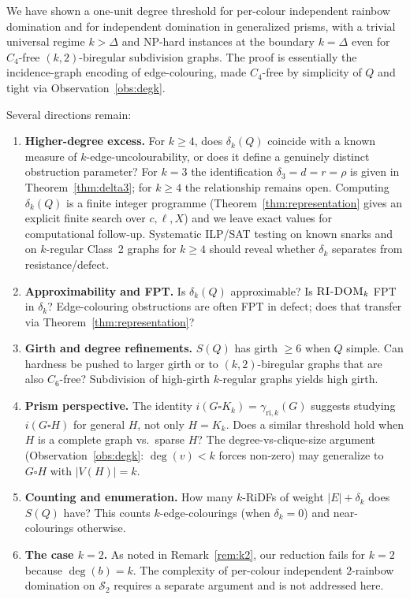 \documentclass[11pt,a4paper]{article}
\theoremstyle{plain}
\theoremstyle{definition}
\newcommand{\gri}{\gamma_{\mathrm{ri},k}}
\newcommand{\cardK}{\square K_k}
\newcommand{\cS}{\mathcal{S}}
\begin{document}
We have shown a one-unit degree threshold for per-colour independent rainbow domination and for independent domination in generalized prisms, with a trivial universal regime $k>\Delta$ and NP-hard instances at the boundary $k=\Delta$ even for $C_{4}$-free $(k,2)$-biregular subdivision graphs. The proof is essentially the incidence-graph encoding of edge-colouring, made $C_{4}$-free by simplicity of $Q$ and tight via Observation~\ref{obs:degk}.

Several directions remain:

\begin{enumerate}
\item \textbf{Higher-degree excess.}
For $k\ge4$, does $\delta_{k}(Q)$ coincide with a known measure of $k$-edge-uncolourability, or does it define a genuinely distinct obstruction parameter? For $k=3$ the identification $\delta_{3}=d=r=\rho$ is given in Theorem~\ref{thm:delta3}; for $k\ge4$ the relationship remains open. Computing $\delta_{k}(Q)$ is a finite integer programme (Theorem~\ref{thm:representation} gives an explicit finite search over $c,\ell,X$) and we leave exact values for computational follow-up. Systematic ILP/SAT testing on known snarks and on $k$-regular Class~2 graphs for $k\ge4$ should reveal whether $\delta_{k}$ separates from resistance/defect.

\item \textbf{Approximability and FPT.}
Is $\delta_{k}(Q)$ approximable? Is $\textsc{RI-DOM}_{k}$ FPT in $\delta_{k}$? Edge-colouring obstructions are often FPT in defect; does that transfer via Theorem~\ref{thm:representation}?

\item \textbf{Girth and degree refinements.}
$S(Q)$ has girth $\ge6$ when $Q$ simple. Can hardness be pushed to larger girth or to $(k,2)$-biregular graphs that are also $C_{6}$-free? Subdivision of high-girth $k$-regular graphs yields high girth.

\item \textbf{Prism perspective.}
The identity $i(G\cardK)=\gri(G)$ suggests studying $i(G\square H)$ for general $H$, not only $H=K_{k}$. Does a similar threshold hold when $H$ is a complete graph vs.\ sparse $H$? The degree-vs-clique-size argument (Observation~\ref{obs:degk}: $\deg(v)<k$ forces non-zero) may generalize to $G\square H$ with $|V(H)|=k$.

\item \textbf{Counting and enumeration.}
How many $k$-RiDFs of weight $|E|+\delta_{k}$ does $S(Q)$ have? This counts $k$-edge-colourings (when $\delta_{k}=0$) and near-colourings otherwise.

\item \textbf{The case $k=2$.}
As noted in Remark~\ref{rem:k2}, our reduction fails for $k=2$ because $\deg(b)=k$. The complexity of per-colour independent $2$-rainbow domination on $\cS_{2}$ requires a separate argument and is not addressed here.
\end{enumerate}
\end{document}

